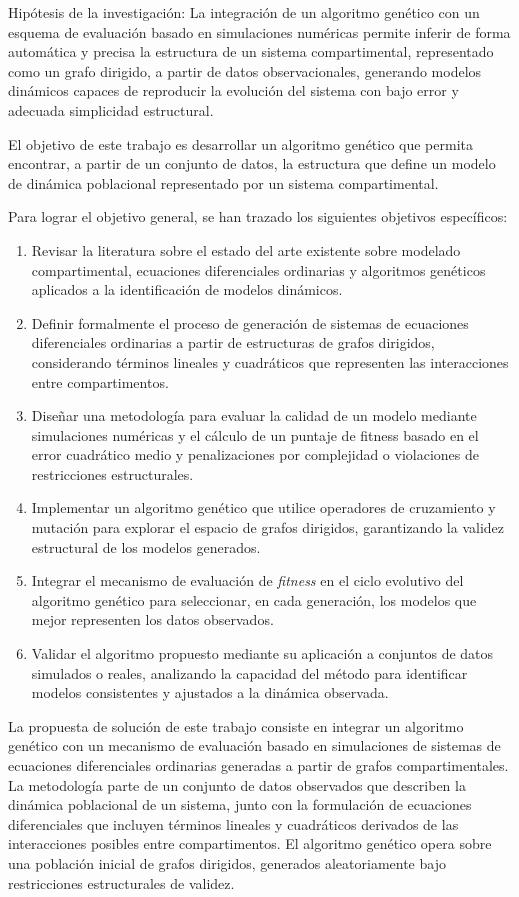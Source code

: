 Hip\'otesis de la investigaci\'on: La integración de un algoritmo genético con un esquema de evaluación basado en simulaciones numéricas permite 
inferir de forma automática y precisa la estructura de un sistema compartimental, representado como un grafo dirigido, a partir de datos observacionales, 
generando modelos dinámicos capaces de reproducir la evolución del sistema con bajo error y adecuada simplicidad estructural.

El objetivo de este trabajo es desarrollar un algoritmo genético que permita encontrar, a partir de un conjunto de datos, 
la estructura que define un modelo de dinámica poblacional representado por un sistema compartimental.

Para lograr el objetivo general, se han trazado los siguientes objetivos
específicos:

\begin{enumerate}
    \item Revisar la literatura sobre el estado del arte existente sobre modelado compartimental, ecuaciones diferenciales ordinarias y algoritmos genéticos aplicados a la identificación de modelos dinámicos.
    \item Definir formalmente el proceso de generación de sistemas de ecuaciones diferenciales ordinarias a partir de estructuras de grafos dirigidos, considerando términos lineales y cuadráticos que representen las interacciones entre compartimentos.
    \item Diseñar una metodología para evaluar la calidad de un modelo mediante simulaciones numéricas y el cálculo de un puntaje de fitness basado en el error cuadrático medio y penalizaciones por complejidad o violaciones de restricciones estructurales.
    \item Implementar un algoritmo genético que utilice operadores de cruzamiento y mutación para explorar el espacio de grafos dirigidos, garantizando la validez estructural de los modelos generados.
    \item Integrar el mecanismo de evaluación de \textit{fitness} en el ciclo evolutivo del algoritmo genético para seleccionar, en cada generación, los modelos que mejor representen los datos observados.
    \item Validar el algoritmo propuesto mediante su aplicación a conjuntos de datos simulados o reales, analizando la capacidad del método para identificar modelos consistentes y ajustados a la dinámica observada.
\end{enumerate}

La propuesta de solución de este trabajo consiste en integrar un algoritmo genético con un mecanismo de evaluación basado en simulaciones 
de sistemas de ecuaciones diferenciales ordinarias generadas a partir de grafos compartimentales. La metodología parte de un conjunto de datos 
observados que describen la dinámica poblacional de un sistema, junto con la formulación de ecuaciones diferenciales que incluyen términos lineales 
y cuadráticos derivados de las interacciones posibles entre compartimentos. El algoritmo genético opera sobre una población inicial de grafos dirigidos, 
generados aleatoriamente bajo restricciones estructurales de validez.

